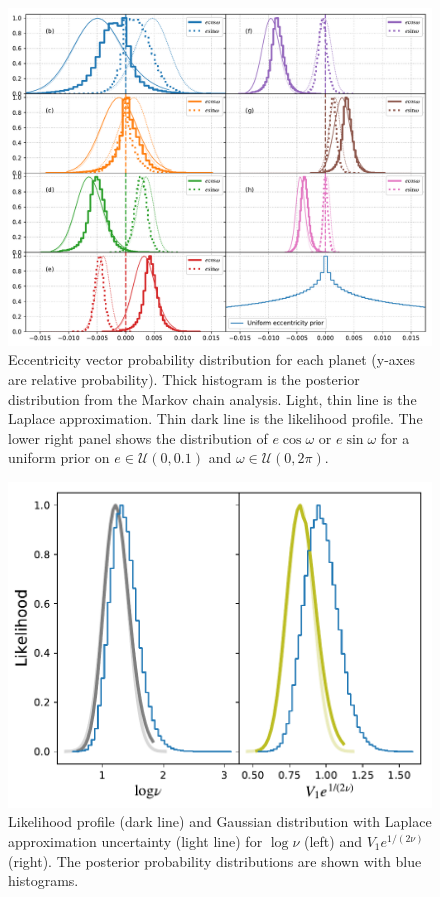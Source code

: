\documentclass[twocolumn]{aastex63}
\begin{document}
\begin{figure}
    \centering
    \includegraphics[width=\hsize]{figures/T1_eccentricity_vectors_likelihood_profile_hmc.pdf}
    \caption{Eccentricity vector probability distribution for each planet (y-axes are relative probability).  Thick histogram is the posterior distribution from the Markov chain analysis.  Light, thin line is the Laplace approximation.  Thin dark line is the likelihood profile.  The lower right panel shows the distribution of
    $e\cos{\omega}$ or $e\sin{\omega}$ for a uniform prior on
    $e \in \mathcal{U}(0,0.1)$ and $\omega \in \mathcal{U}(0,2\pi)$.}
    \label{fig:ecc_likelihood_profile}
\end{figure}


\begin{figure}
    \centering
    \includegraphics[width=\columnwidth]{figures/T1_students_params_transformed.pdf}
    \caption{Likelihood profile (dark line) and Gaussian distribution
    with Laplace approximation uncertainty (light line) for $\log{\nu}$ (left) and
    $V_1 e^{1/(2\nu)}$ (right).  The posterior probability distributions are shown with blue histograms.}
    \label{fig:student_param_likelihood_profile}
\end{figure}
\end{document}
